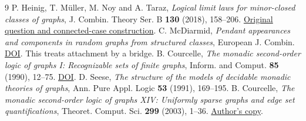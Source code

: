 \documentclass[11pt]{article}
\begin{document}
\begin{thebibliography}{9}
 P. Heinig, T. M\"uller, M. Noy and A. Taraz, \emph{Logical limit laws for minor-closed classes of graphs}, J. Combin. Theory Ser. B \textbf{130} (2018), 158--206. \href{https://arxiv.org/abs/1401.7021}{Original question and connected-case construction}.
 C. McDiarmid, \emph{Pendant appearances and components in random graphs from structured classes}, European J. Combin. \href{https://doi.org/10.1016/j.ejc.2024.103994}{DOI}. This treats attachment by a bridge.
 B. Courcelle, \emph{The monadic second-order logic of graphs I: Recognizable sets of finite graphs}, Inform. and Comput. \textbf{85} (1990), 12--75. \href{https://doi.org/10.1016/0890-5401(90)90043-H}{DOI}.
 D. Seese, \emph{The structure of the models of decidable monadic theories of graphs}, Ann. Pure Appl. Logic \textbf{53} (1991), 169--195.
 B. Courcelle, \emph{The monadic second-order logic of graphs XIV: Uniformly sparse graphs and edge set quantifications}, Theoret. Comput. Sci. \textbf{299} (2003), 1--36. \href{https://www.labri.fr/perso/courcell/Textes1/MSOL14%282003%29.pdf}{Author's copy}.
\end{thebibliography}
\end{document}
